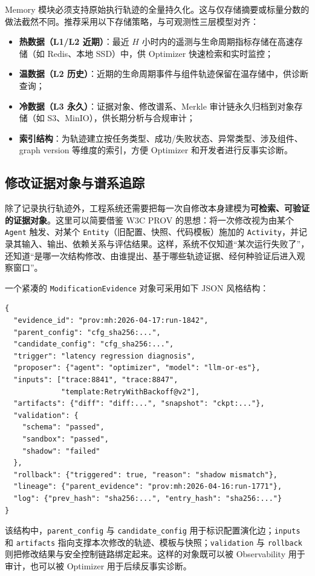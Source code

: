 Memory 模块必须支持原始执行轨迹的全量持久化。这与仅存储摘要或标量分数的做法截然不同。推荐采用以下存储策略，与可观测性三层模型对齐：
\begin{itemize}
    \item \textbf{热数据（L1/L2 近期）}：最近 $H$ 小时内的遥测与生命周期指标存储在高速存储（如 Redis、本地 SSD）中，供 Optimizer 快速检索和实时监控；
    \item \textbf{温数据（L2 历史）}：近期的生命周期事件与组件轨迹保留在温存储中，供诊断查询；
    \item \textbf{冷数据（L3 永久）}：证据对象、修改谱系、Merkle 审计链永久归档到对象存储（如 S3、MinIO），供长期分析与合规审计；
    \item \textbf{索引结构}：为轨迹建立按任务类型、成功/失败状态、异常类型、涉及组件、graph version 等维度的索引，方便 Optimizer 和开发者进行反事实诊断。
\end{itemize}

\subsection{修改证据对象与谱系追踪}

除了记录执行轨迹外，工程系统还需要把每一次自修改本身建模为\textbf{可检索、可验证的证据对象}。这里可以简要借鉴 W3C PROV 的思想：将一次修改视为由某个 \texttt{Agent} 触发、对某个 \texttt{Entity}（旧配置、快照、代码模板）施加的 \texttt{Activity}，并记录其输入、输出、依赖关系与评估结果。这样，系统不仅知道“某次运行失败了”，还知道“是哪一次结构修改、由谁提出、基于哪些轨迹证据、经何种验证后进入观察窗口”。

一个紧凑的 \texttt{ModificationEvidence} 对象可采用如下 JSON 风格结构：

\begin{verbatim}
{
  "evidence_id": "prov:mh:2026-04-17:run-1842",
  "parent_config": "cfg_sha256:...",
  "candidate_config": "cfg_sha256:...",
  "trigger": "latency regression diagnosis",
  "proposer": {"agent": "optimizer", "model": "llm-or-es"},
  "inputs": ["trace:8841", "trace:8847",
             "template:RetryWithBackoff@v2"],
  "artifacts": {"diff": "diff:...", "snapshot": "ckpt:..."},
  "validation": {
    "schema": "passed",
    "sandbox": "passed",
    "shadow": "failed"
  },
  "rollback": {"triggered": true, "reason": "shadow mismatch"},
  "lineage": {"parent_evidence": "prov:mh:2026-04-16:run-1771"},
  "log": {"prev_hash": "sha256:...", "entry_hash": "sha256:..."}
}
\end{verbatim}

该结构中，\texttt{parent\_config} 与 \texttt{candidate\_config} 用于标识配置演化边；\texttt{inputs} 和 \texttt{artifacts} 指向支撑本次修改的轨迹、模板与快照；\texttt{validation} 与 \texttt{rollback} 则把修改结果与安全控制链路绑定起来。这样的对象既可以被 Observability 用于审计，也可以被 Optimizer 用于后续反事实诊断。

